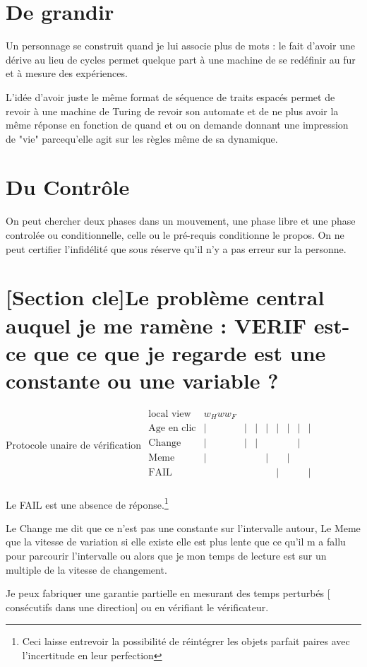 \documentclass{article}
\begin{document}
 \section{ De grandir}
 Un personnage se construit quand je lui associe plus de mots : le fait d'avoir une dérive au lieu de cycles permet quelque part 
 à une machine de se redéfinir au fur et à mesure  des expériences. 
 
 L'idée d'avoir juste le même format de séquence de traits espacés permet de revoir à une machine de Turing de revoir son automate et de ne plus avoir la même réponse en fonction de quand et ou on demande donnant une impression de "vie" parcequ'elle agit sur les règles même de sa dynamique.
 
 \section{ Du Contrôle}
On peut chercher  deux phases dans un mouvement, une phase libre et une phase controlée ou conditionnelle, celle ou le pré-requis conditionne le propos.
 On ne peut certifier l'infidélité que sous réserve qu'il n'y a pas erreur sur la personne.
   
\section{ [Section cle]Le problème central auquel je me ramène : VERIF est-ce que ce que je regarde est  une constante ou une variable ?}
Protocole unaire de vérification
$
\begin{matrix}
\text{local view}&w_Hww_F&&&&&&\\
\text{Age en clic}&|&|&|&|&|&|&|&|\\
\text{Change}&|&|&|&&&&|\\
\text {Meme}&|&&&|&&|&\\
\text{FAIL}&&&&&|&&&|\\
\end{matrix}
 $
 
 Le FAIL est une absence de réponse.\footnote{Ceci laisse entrevoir la possibilité de réintégrer les objets parfait paires avec l'incertitude en leur perfection}
 
 Le Change me dit que ce n'est pas une constante sur l'intervalle autour, Le Meme que la vitesse de variation si elle existe elle est plus lente que ce qu'il m a fallu pour parcourir l'intervalle ou alors que je mon temps de lecture est sur un multiple de la vitesse de changement.
 
 Je peux fabriquer une garantie  partielle en mesurant des temps perturbés  [ consécutifs dans une direction]  ou en vérifiant  le vérificateur.
 
\end{document}
